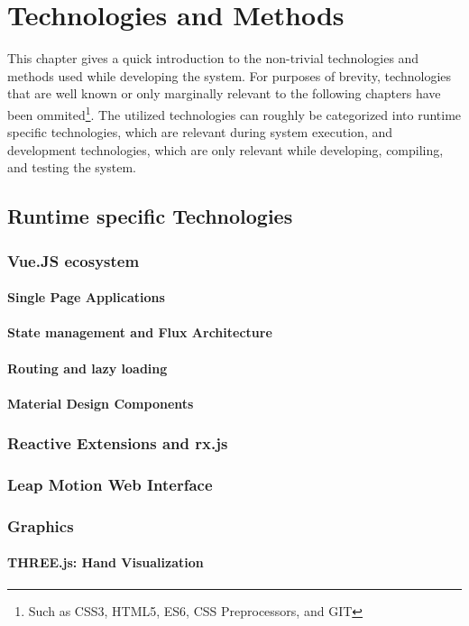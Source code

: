 \chapter{Technologies and Methods}
\label{sec:tech_and_methods}
This chapter gives a quick introduction to the non-trivial technologies and methods used while developing the system. For purposes of brevity, technologies that are well known or only marginally relevant to the following chapters have been ommited\footnote{Such as CSS3, HTML5, ES6, CSS Preprocessors, and GIT}. The utilized technologies can roughly be categorized into runtime specific technologies, which are relevant during system execution, and development technologies, which are only relevant while developing, compiling, and testing the system. 
\section{Runtime specific Technologies}
\subsection{Vue.JS ecosystem}
\subsubsection{Single Page Applications}
\subsubsection{State management and Flux Architecture}
\subsubsection{Routing and lazy loading}
\subsubsection{Material Design Components}
\subsection{Reactive Extensions and rx.js}
\subsection{Leap Motion Web Interface}
\subsection{Graphics}
\subsubsection{THREE.js: Hand Visualization}
